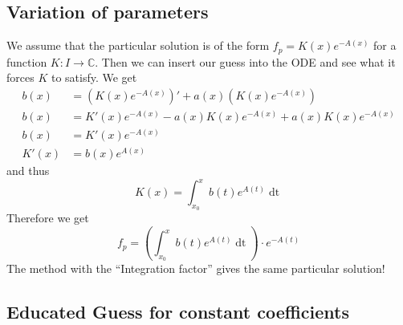 \documentclass[a4paper,fontsize = 10pt]{article}
\def\C{\mathbb{C}}
\begin{document}
\subsection{Variation of parameters}
We assume that the particular solution is of the form \(f_p = K(x)e^{-A(x)}\) for a function \(K: I \to \C\). Then we can insert our guess into the ODE and see what it forces $K$ to satisfy. We get 
    \begin{align*}
        b(x) &= (K(x)e^{-A(x)})' + a(x)(K(x)e^{-A(x)})  \\
        b (x) &= K'(x)e^{-A(x)} - a(x)K(x)e^{-A(x)} + a(x)K(x)e^{-A(x)} \\
        b(x)  &= K'(x)e^{-A(x)} \\
        K'(x) &= b(x)e^{A(x)}
    \end{align*}
    and thus \[K(x) = \int_{x_0}^x b(t) e^{A(t)} \mathop{dt}\] Therefore we get \[f_p = \left(\int_{x_0}^x b(t) e^{A(t)} \mathop{dt}\right) \cdot e^{-A(t)}\]
    The method with the ``Integration factor'' gives the same particular solution!


\subsection{Educated Guess for constant coefficients}
\end{document}
